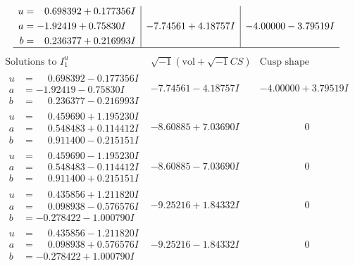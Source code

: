 \documentclass[1p]{elsarticle_modified}
\theoremstyle{definition}
\newcommand{\I}{\sqrt{-1}}
\begin{document}
$$\begin{array}{c|c|c}
\begin{aligned}
u &= \phantom{-}0.698392 + 0.177356 I \\
a &= -1.92419 + 0.75830 I \\
b &= \phantom{-}0.236377 + 0.216993 I\end{aligned}
 & -7.74561 + 4.18757 I & -4.00000 - 3.79519 I\\
 \hline 
 \end{array}$$\newpage$$\begin{array}{c|c|c}  
\text{Solutions to }I^u_{1}& \I (\text{vol} + \sqrt{-1}CS) & \text{Cusp shape}\\
 \hline 
\begin{aligned}
u &= \phantom{-}0.698392 - 0.177356 I \\
a &= -1.92419 - 0.75830 I \\
b &= \phantom{-}0.236377 - 0.216993 I\end{aligned}
 & -7.74561 - 4.18757 I & -4.00000 + 3.79519 I \\ \hline\begin{aligned}
u &= \phantom{-}0.459690 + 1.195230 I \\
a &= \phantom{-}0.548483 + 0.114412 I \\
b &= \phantom{-}0.911400 - 0.215151 I\end{aligned}
 & -8.60885 + 7.03690 I & \phantom{-0.000000 } 0 \\ \hline\begin{aligned}
u &= \phantom{-}0.459690 - 1.195230 I \\
a &= \phantom{-}0.548483 - 0.114412 I \\
b &= \phantom{-}0.911400 + 0.215151 I\end{aligned}
 & -8.60885 - 7.03690 I & \phantom{-0.000000 } 0 \\ \hline\begin{aligned}
u &= \phantom{-}0.435856 + 1.211820 I \\
a &= \phantom{-}0.098938 - 0.576576 I \\
b &= -0.278422 - 1.000790 I\end{aligned}
 & -9.25216 + 1.84332 I & \phantom{-0.000000 } 0 \\ \hline\begin{aligned}
u &= \phantom{-}0.435856 - 1.211820 I \\
a &= \phantom{-}0.098938 + 0.576576 I \\
b &= -0.278422 + 1.000790 I\end{aligned}
 & -9.25216 - 1.84332 I & \phantom{-0.000000 } 0 \\ \hline\begin{aligned}

\end{aligned}
\end{array}$$
\end{document}
